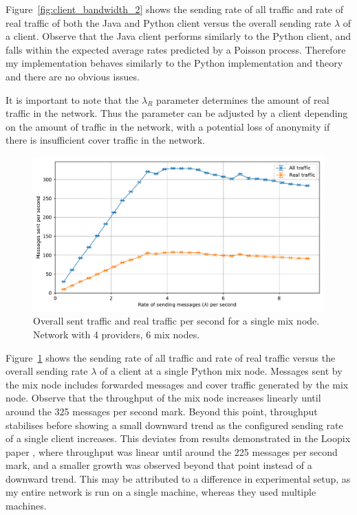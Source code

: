 \documentclass[final,dissertation.tex]{subfiles}
\begin{document}
Figure~\ref{fig:client_bandwidth_2} shows the sending rate of all traffic and rate of real traffic of both the Java and Python client versus the overall sending rate $\lambda$ of a client. Observe that the Java client performs similarly to the Python client, and falls within the expected average rates predicted by a Poisson process. Therefore my implementation behaves similarly to the Python implementation and theory and there are no obvious issues.

It is important to note that the $\lambda_R$ parameter determines the amount of real traffic in the network. Thus the parameter can be adjusted by a client depending on the amount of traffic in the network, with a potential loss of anonymity if there is insufficient cover traffic in the network.

\begin{figure}[h]
	\includegraphics[width=\linewidth]{../figs/mix_bandwidth}
	\caption{Overall sent traffic and real traffic per second for a single mix node. Network with 4 providers, 6 mix nodes.}
	\label{fig:mix_bandwidth}
\end{figure}

Figure~\ref{fig:mix_bandwidth} shows the sending rate of all traffic and rate of real traffic versus the overall sending rate $\lambda$ of a client at a single Python mix node. Messages sent by the mix node includes forwarded messages and cover traffic generated by the mix node. Observe that the throughput of the mix node increases linearly until around the 325 messages per second mark. Beyond this point, throughput stabilises before showing a small downward trend as the configured sending rate of a single client increases. This deviates from results demonstrated in the Loopix paper \cite{piotrowska2017loopix}, where throughput was linear until around the 225 messages per second mark, and a smaller growth was observed beyond that point instead of a downward trend. This may be attributed to a difference in experimental setup, as my entire network is run on a single machine, whereas they used multiple machines.
\end{document}
